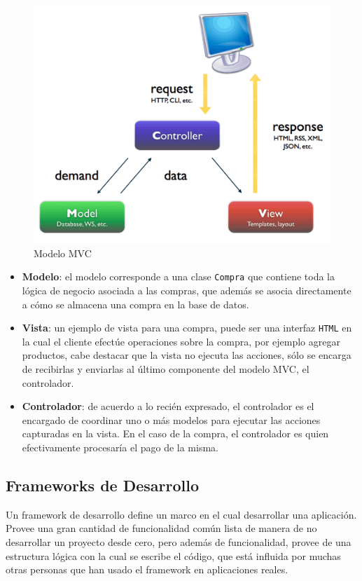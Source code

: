 \begin{figure}[!h]
  \centering
  \includegraphics[scale=.5]{images/mvc.png}
  \caption{Modelo MVC}
  \label{modelomvc}
\end{figure}

\begin{itemize}
  \item \textbf{Modelo}: el modelo corresponde a una clase \texttt{Compra} que contiene toda la lógica de negocio asociada a las compras, que además se asocia directamente a cómo se almacena una compra en la base de datos.
  \item \textbf{Vista}: un ejemplo de vista para una compra, puede ser una interfaz \texttt{HTML} en la cual el cliente efectúe operaciones sobre la compra, por ejemplo agregar productos, cabe destacar que la vista no ejecuta las acciones, sólo se encarga de recibirlas y enviarlas al último componente del modelo MVC, el controlador.
  \item \textbf{Controlador}: de acuerdo a lo recién expresado, el controlador es el encargado de coordinar uno o más modelos para ejecutar las acciones capturadas en la vista. En el caso de la compra, el controlador es quien efectivamente procesaría el pago de la misma.
\end{itemize}

\subsection{Frameworks de Desarrollo} %
\label{sub:frameworks_de_desarollo}
Un framework de desarrollo define un marco en el cual desarrollar una aplicación. Provee una gran cantidad de funcionalidad común lista de manera de no desarrollar un proyecto desde cero, pero además de funcionalidad, provee de una estructura lógica con la cual se escribe el código, que está influida por muchas otras personas que han usado el framework en aplicaciones reales.

